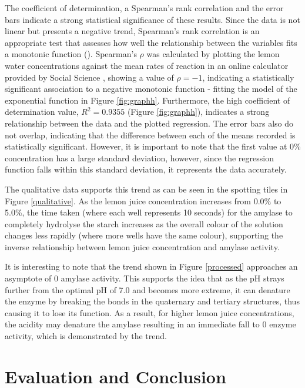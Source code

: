 \documentclass[12pt]{article}
\begin{document}
The coefficient of determination, a Spearman's rank correlation and the error bars indicate a strong statistical significance of these results. Since the data is not linear but presents a negative trend, Spearman's rank correlation is an appropriate test that assesses how well the relationship between the variables fits a monotonic function (\citeauthor{lund_lund}). Spearman's $\rho$ was calculated by plotting the lemon water concentrations against the mean rates of reaction in an online calculator provided by Social Science \citeauthor{social_science_statistics}, showing a value of $\rho = -1$, indicating a statistically significant association to a negative monotonic function - fitting the model of the exponential function in Figure \ref{fig:graphh}. Furthermore, the high coefficient of determination value, $R^2 = 0.9355$ (Figure \ref{fig:graphh}), indicates a strong  relationship between the data and the plotted regression. The error bars also do not overlap, indicating that the difference between each of the means recorded is statistically significant. However, it is important to note that the first value at 0\% concentration has a large standard deviation, however, since the regression function falls within this standard deviation, it represents the data accurately.

The qualitative data supports this trend as can be seen in the spotting tiles in Figure \ref{qualitative}. As the lemon juice concentration increases from 0.0\% to 5.0\%, the time taken (where each well represents 10 seconds) for the amylase to completely hydrolyse the starch increases as the overall colour of the solution changes less rapidly (where more wells have the same colour), supporting the inverse relationship between lemon juice concentration and amylase activity. 

It is interesting to note that the trend shown in Figure \ref{processed} approaches an asymptote of 0 amylase activity. This supports the idea that as the pH strays further from the optimal pH of 7.0 and becomes more extreme, it can denature the enzyme by breaking the bonds in the quaternary and tertiary structures, thus causing it to lose its function. As a result, for higher lemon juice concentrations, the acidity may denature the amylase resulting in an immediate fall to 0 enzyme activity, which is demonstrated by the trend. 

\section{Evaluation and Conclusion}
\end{document}

